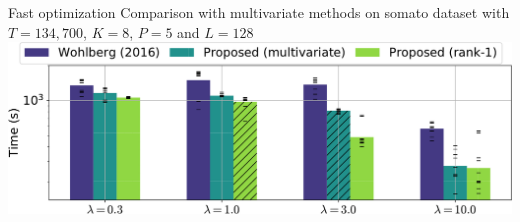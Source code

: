 \documentclass{beamer}
\begin{document}
\begin{frame}{Fast optimization}
Comparison with multivariate methods on somato dataset with $T=134,700$, $K=8$, $P=5$ and $L=128$\\[1em]
\includegraphics[width=\textwidth]{all_last_0001_T_13470_P5_K8_L128}
\end{frame}
\end{document}
